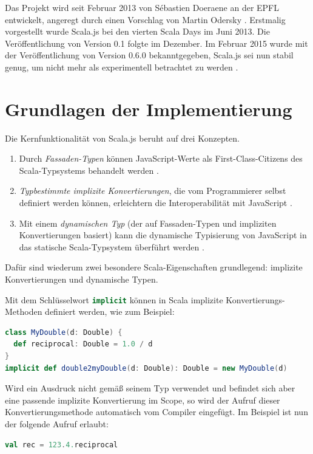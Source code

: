 \documentclass[a4paper, 12pt, hidelinks, listof=totoc, listoftables=totoc, bibliography=totoc]{scrreprt}
\newcommand{\scala}[1]{\lstinline[language=Scala, style=inline]|#1|}
\begin{document}
Das Projekt wird seit Februar 2013 von Sébastien Doeraene an der \ac{EPFL} entwickelt, angeregt durch einen Vorschlag von Martin Odersky \cite{doeraene2013.CSJ}. Erstmalig vorgestellt wurde Scala.js bei den vierten Scala Days im Juni 2013. Die Veröffentlichung von Version 0.1 folgte im Dezember. Im Februar 2015 wurde mit der Veröffentlichung von Version 0.6.0 bekanntgegeben, Scala.js sei nun stabil genug, um nicht mehr als experimentell betrachtet zu werden \cite{doeraene2015.SNL}.


\section{Grundlagen der Implementierung}

Die Kernfunktionalität von Scala.js beruht auf drei Konzepten.
\begin{enumerate}
	\item Durch \emph{Fassaden-Typen} können JavaScript-Werte als First-Class-Citizens des Scala-Typsystems behandelt werden \cite[S. 4]{doeraene2013.TDI}.
	\item \emph{Typbestimmte implizite Konvertierungen}, die vom Programmierer selbst definiert werden können, erleichtern die Interoperabilität mit JavaScript \cite[S. 5]{doeraene2013.TDI}.
	\item Mit einem \emph{dynamischen Typ} (der auf Fassaden-Typen und impliziten Konvertierungen basiert) kann die dynamische Typisierung von JavaScript in das statische Scala-Typsystem überführt werden \cite[S. 6]{doeraene2013.TDI}.
\end{enumerate}

Dafür sind wiederum zwei besondere Scala-Eigenschaften grundlegend: implizite Konvertierungen und dynamische Typen.

Mit dem Schlüsselwort \scala{implicit} können in Scala implizite Konvertierungs-Methoden definiert werden, wie zum Beispiel:
\begin{lstlisting}[language=Scala, style=snippet]
class MyDouble(d: Double) {
  def reciprocal: Double = 1.0 / d
}
implicit def double2myDouble(d: Double): Double = new MyDouble(d)
\end{lstlisting}

Wird ein Ausdruck nicht gemäß seinem Typ verwendet und befindet sich aber eine passende implizite Konvertierung im Scope, so wird der Aufruf dieser Konvertierungsmethode automatisch vom Compiler eingefügt. Im Beispiel ist nun der folgende Aufruf erlaubt:

\begin{lstlisting}[language=Scala, style=snippet]
val rec = 123.4.reciprocal
\end{lstlisting}
\end{document}
